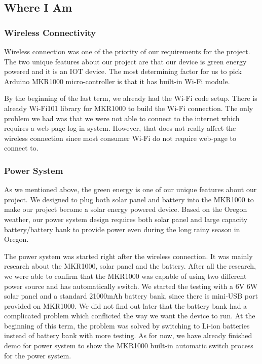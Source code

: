 \documentclass[IEEEtran,letterpaper,10pt,titlepage,fleqn,draftclsnofoot,onecolumn]{article}
\begin{document}
\subsection{Where I Am}

\subsubsection{Wireless Connectivity}

Wireless connection was one of the priority of our requirements for the project. The two unique features about our project are that our device is green energy powered and it is an IOT device. The most determining factor for us to pick Arduino MKR1000 micro-controller is that it has built-in Wi-Fi module. 

By the beginning of the last term, we already had the Wi-Fi code setup. There is already Wi-Fi101 library for MKR1000 to build the Wi-Fi connection. The only problem we had was that we were not able to connect to the internet which requires a web-page log-in system. However, that does not really affect the wireless connection since most consumer Wi-Fi do not require web-page to connect to. 

\subsubsection{Power System}

As we mentioned above, the green energy is one of our unique features about our project. We designed to plug both solar panel and battery into the MKR1000 to make our project become a solar energy powered device. Based on the Oregon weather, our power system design requires both solar panel and large capacity battery/battery bank to provide power even during the long rainy season in Oregon.

The power system was started right after the wireless connection. It was mainly research about the MKR1000, solar panel and the battery. After all the research, we were able to confirm that the MKR1000 was capable of using two different power source and has automatically switch. We started the testing with a 6V 6W solar panel and a standard 21000mAh battery bank, since there is mini-USB port provided on MKR1000. We did not find out later that the battery bank had a complicated problem which conflicted the way we want the device to run. At the beginning of this term, the problem was solved by switching to Li-ion batteries instead of battery bank with more testing. As for now, we have already finished demo for power system to show the MKR1000 built-in automatic switch process for the power system.
\end{document}
